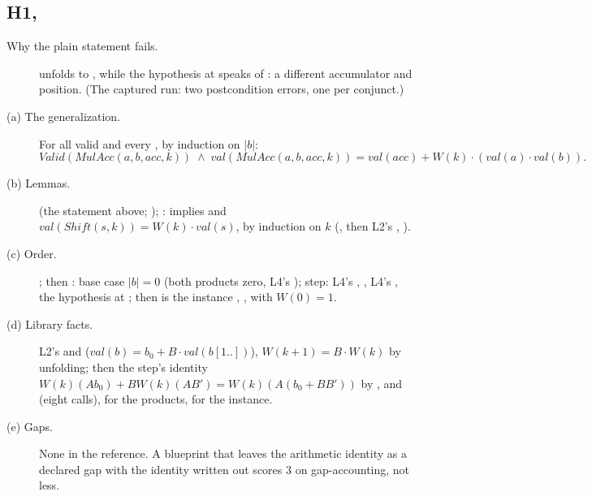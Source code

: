 \documentclass[11pt]{article}
\begin{document}
\subsection*{H1, }
\begin{description}
\item[Why the plain statement fails.]  unfolds to
  , while the
  hypothesis at  speaks of : a
  different accumulator and position. (The captured run: two postcondition
  errors, one per conjunct.)
\item[(a) The generalization.] For all  valid and every
  , by induction on $|b|$:
  \[ \mathit{Valid}(\mathit{MulAcc}(a,b,acc,k)) \;\wedge\;
     \mathit{val}(\mathit{MulAcc}(a,b,acc,k)) = \mathit{val}(acc) +
     W(k)\cdot(\mathit{val}(a)\cdot\mathit{val}(b)). \]
\item[(b) Lemmas.]  (the statement above; ); :  implies
   and $\mathit{val}(\mathit{Shift}(s,k)) =
  W(k)\cdot\mathit{val}(s)$, by induction on $k$ (, then L2's , ).
\item[(c) Order.] ; then : base case
  $|b| = 0$ (both products zero, L4's ); step: L4's
  , ,
  L4's , the hypothesis at
  ; then  is the
  instance , , with $W(0) = 1$.
\item[(d) Library facts.] L2's  and 
  ($\mathit{val}(b) = b_0 + B\cdot\mathit{val}(b[1..])$), $W(k+1) =
  B\cdot W(k)$ by unfolding; then the step's identity
  $W(k)(A b_0) + B W(k)(A B') = W(k)(A(b_0 + B B'))$ by
  ,  and
   (eight calls),  for the
   products,  for the instance.
\item[(e) Gaps.] None in the reference. A blueprint that leaves the
  arithmetic identity as a declared gap with the identity written out scores
  3 on gap-accounting, not less.
\end{description}
\end{document}
